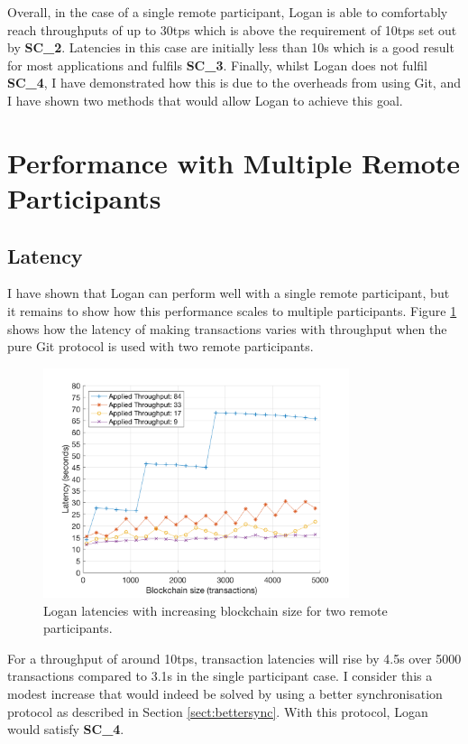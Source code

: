 \documentclass[12pt,a4paper,twoside,openright]{report}
\begin{document}
	Overall, in the case of a single remote participant, Logan is able to comfortably reach throughputs of up to 30tps which is above the requirement of 10tps set out by \textbf{SC\_2}. 
	Latencies in this case are initially less than 10s which is a good result for most applications and fulfils \textbf{SC\_3}.
	Finally, whilst Logan does not fulfil \textbf{SC\_4}, I have demonstrated how this is due to the overheads from using Git, and I have shown two methods that would allow Logan to achieve this goal.

	\section{Performance with Multiple Remote Participants}
	\subsection{Latency}
	I have shown that Logan can perform well with a single remote participant, but it remains to show how this performance scales to multiple participants. 
	Figure \ref{figs:tworems} shows how the latency of making transactions varies with throughput when the pure Git protocol is used with two remote participants.
	\begin{figure}
		\centering
		\includegraphics[width=0.8\textwidth]{figs/2latencies_sizes_throughputs.png}
		\caption{Logan latencies with increasing blockchain size for two remote participants.}
		\label{figs:tworems}
	\end{figure}
	For a throughput of around 10tps, transaction latencies will rise by 4.5s over 5000 transactions compared to 3.1s in the single participant case.
	I consider this a modest increase that would indeed be solved by using a better synchronisation protocol as described in Section \ref{sect:bettersync}. 
	With this protocol, Logan would satisfy \textbf{SC\_4}.\\
\end{document}
